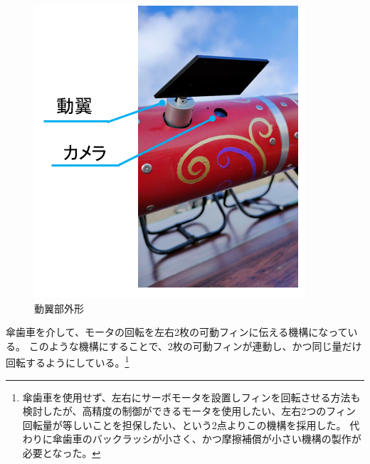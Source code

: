 \documentclass[a4paper,11pt,titlepage,uplatex]{jsarticle}
\begin{document}
\begin{figure}[H]
    \centering
    \includegraphics[scale = 0.55]{pic_str/s_r_outer.png}
    \caption{動翼部外形}
    \label{s_r_outer}
\end{figure}

傘歯車を介して、モータの回転を左右2枚の可動フィンに伝える機構になっている。
このような機構にすることで、2枚の可動フィンが連動し、かつ同じ量だけ回転するようにしている。\footnote{
    傘歯車を使用せず、左右にサーボモータを設置しフィンを回転させる方法も検討したが、高精度の制御ができるモータを使用したい、左右2つのフィン回転量が等しいことを担保したい、という2点よりこの機構を採用した。
    代わりに傘歯車のバックラッシが小さく、かつ摩擦補償が小さい機構の製作が必要となった。}
\end{document}
